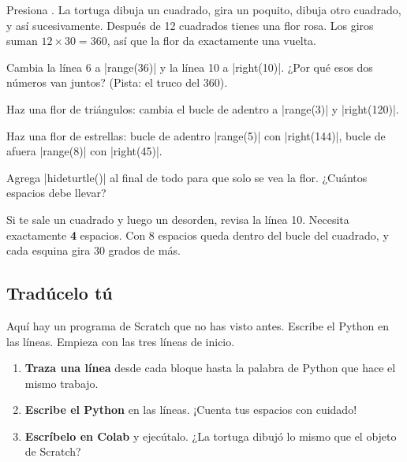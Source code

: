 Presiona \playbtn. La tortuga dibuja un cuadrado, gira un poquito, dibuja otro cuadrado, y así sucesivamente. Después de 12 cuadrados tienes una flor rosa. Los giros suman $12 \times 30 = 360$, así que la flor da exactamente una vuelta.


\begin{challenge}
\tick Cambia la línea 6 a \py|range(36)| y la línea 10 a \py|right(10)|. ¿Por qué esos dos números van juntos? (Pista: el truco del 360).\par
\tick Haz una flor de triángulos: cambia el bucle de adentro a \py|range(3)| y \py|right(120)|.\par
\tick Haz una flor de estrellas: bucle de adentro \py|range(5)| con \py|right(144)|, bucle de afuera \py|range(8)| con \py|right(45)|.\par
\tick Agrega \py|hideturtle()| al final de todo para que solo se vea la flor. ¿Cuántos espacios debe llevar?
\end{challenge}

\begin{watchout}
Si te sale un cuadrado y luego un desorden, revisa la línea 10. Necesita exactamente \textbf{4} espacios. Con 8 espacios queda dentro del bucle del cuadrado, y cada esquina gira 30 grados de más.
\end{watchout}

\clearpage
\subsection*{Tradúcelo tú}

Aquí hay un programa de Scratch que no has visto antes. Escribe el Python en las líneas. Empieza con las tres líneas de inicio.

\begin{enumerate}
  \item \textbf{Traza una línea} desde cada bloque hasta la palabra de Python que hace el mismo trabajo.
  \item \textbf{Escribe el Python} en las líneas. ¡Cuenta tus espacios con cuidado!
  \item \textbf{Escríbelo en Colab} y ejecútalo. ¿La tortuga dibujó lo mismo que el objeto de Scratch?
\end{enumerate}

